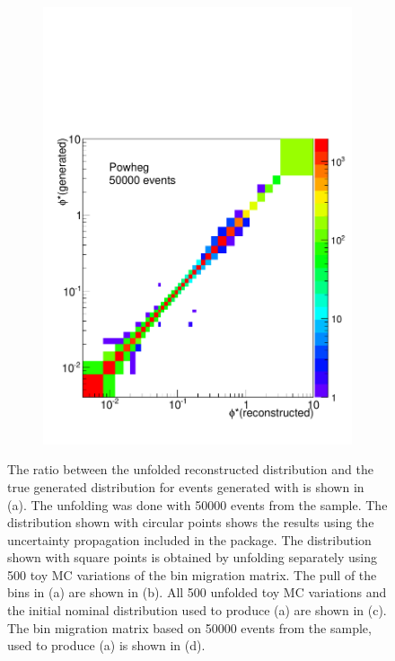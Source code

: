 \begin{figure}[!htbp]
\begin{subfigure}[b]{\SideBySidePlotWidth}
        \includegraphics[width=\textwidth]{figures/BinM_P_50000.pdf}
        \caption{}
        \label{fig:bin_migration_50000}
    \end{subfigure}
    \caption{
        The ratio between the unfolded reconstructed \phistar distribution and
        the true generated \phistar distribution for \Ztoee events generated
        with \MADGRAPH is shown in (a). The unfolding was done with \num{50000}
        events from the \POWHEG sample. The distribution shown with circular
        points shows the results using the uncertainty propagation included in
        the \RooUnfold package. The distribution shown with square points is
        obtained by unfolding separately using 500 toy MC variations of the bin
        migration matrix. The pull of the bins in (a) are shown in (b). All
        \num{500} unfolded toy MC variations and the initial nominal
        distribution used to produce (a) are shown in (c). The bin migration
        matrix based on \num{50000} events from the \POWHEG sample, used to
        produce (a) is shown in (d).
    }
\label{fig:50000_propegation_unfolding}
\end{figure}

